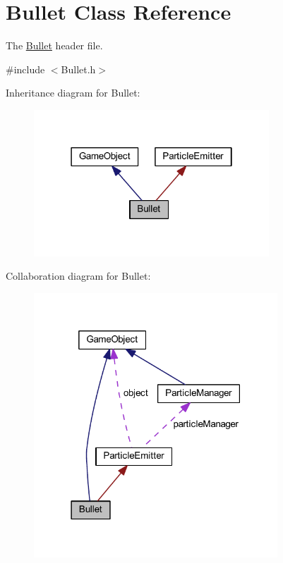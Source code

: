\hypertarget{class_bullet}{\section{Bullet Class Reference}
\label{class_bullet}
}


The \hyperlink{class_bullet}{Bullet} header file.  




{\ttfamily \#include $<$Bullet.\+h$>$}



Inheritance diagram for Bullet\+:\nopagebreak
\begin{figure}[H]
\begin{center}
\leavevmode
\includegraphics[width=250pt]{class_bullet__inherit__graph}
\end{center}
\end{figure}


Collaboration diagram for Bullet\+:\nopagebreak
\begin{figure}[H]
\begin{center}
\leavevmode
\includegraphics[width=259pt]{class_bullet__coll__graph}
\end{center}
\end{figure}
